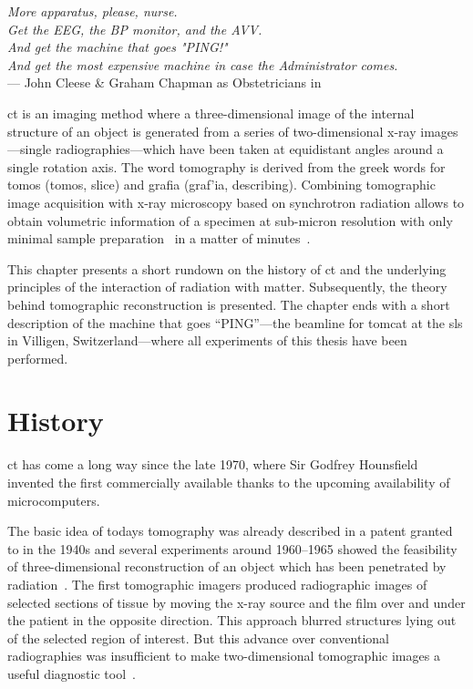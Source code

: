 \acresetall
{}\label{ch:ct}
\begin{flushright}{\slshape More apparatus, please, nurse.\\
				Get the EEG, the BP monitor, and the AVV.\\
				And get the machine that goes "PING!"\\
				And get the most expensive machine in case the Administrator comes.} \\ \medskip
	--- John Cleese \& Graham Chapman as Obstetricians in \citep{TheMeaningOfLife}
\end{flushright}
\vspace{52mm}
\ac{ct} is an imaging method where a three-dimensional image of the internal structure of an object is generated from a series of two-dimensional x-ray images---single radiographies---which have been taken at equidistant angles around a single rotation axis. The word tomography is derived from the greek words for tomos (\greektext tomos\latintext, slice) and grafia (\greektext graf'ia\latintext, describing). Combining tomographic image acquisition with x-ray microscopy based on synchrotron radiation allows to obtain volumetric information of a specimen at sub-micron resolution with only minimal sample preparation~\cite{Stampanoni2006a} in a matter of minutes~\cite{Hintermueller2010}.

This chapter presents a short rundown on the history of \ac{ct} and the underlying principles of the interaction of radiation with matter. Subsequently, the theory behind tomographic reconstruction is presented. The chapter ends with a short description of the machine that goes ``PING''---the beamline for \ac{tomcat} at the \ac{sls} in Villigen, Switzerland---where all experiments of this thesis have been performed.

\section{History}
\acl{ct} has come a long way since the late 1970, where Sir Godfrey Hounsfield invented the first commercially available thanks to the upcoming availability of microcomputers.

The basic idea of todays tomography was already described in a patent granted to \citet{Frank1942} in the 1940s and several experiments around 1960--1965 showed the feasibility of three-dimensional reconstruction of an object which has been penetrated by radiation~\cite{Hsieh2003}. The first tomographic imagers produced radiographic images of selected sections of tissue by moving the x-ray source and the film over and under the patient in the opposite direction. This approach blurred structures lying out of the selected region of interest. But this advance over conventional radiographies was insufficient to make two-dimensional tomographic images a useful diagnostic tool~\cite{Robb2003}.

